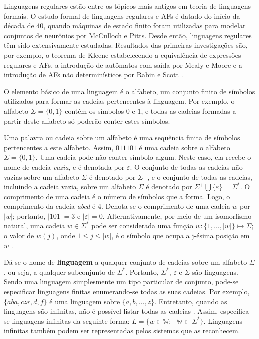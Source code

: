 \documentclass[12pt,a4paper]{article}
\begin{document}
Linguagens regulares estão entre os tópicos mais antigos em teoria de
linguagens formais. O estudo formal de linguagens regulares
e AFs é datado do início da década de 40, quando máquinas
de estado finito foram utilizadas para modelar conjuntos de neurônios
por McCulloch e Pitts. Desde então, linguagens regulares têm sido
extensivamente estudadas. Resultados das primeiras investigações são,
por exemplo, o teorema de Kleene estabelecendo a equivalência de
expressões regulares e AFs, a introdução de autômatos
com saída por Mealy e Moore e a introdução de AFs não
determinísticos por Rabin e Scott .

O elemento básico de uma linguagem é o alfabeto, um conjunto finito de símbolos
utilizados para formar as cadeias pertencentes à linguagem. Por exemplo, o
alfabeto $\Sigma = \{0,1\}$ contém os símbolos $0$ e $1$, e todas as cadeias
formadas a partir deste alfabeto só poderão conter estes símbolos.

Uma palavra ou cadeia sobre um alfabeto é uma sequência finita de símbolos
pertencentes a este alfabeto. Assim, $011101$ é uma cadeia sobre o alfabeto
$\Sigma = \{0, 1\}$. Uma cadeia pode não conter símbolo algum. Neste caso,
ela recebe o nome de cadeia \textit{vazia}, e é denotada por $\varepsilon$.
O conjunto de todas as cadeias não vazias sobre um alfabeto $\Sigma$ é
denotado por $\Sigma^+$, e o conjunto de todas as cadeias, incluindo
a cadeia vazia, sobre um alfabeto $\Sigma$ é denotado por
${\Sigma}^+ \bigcup \{\varepsilon\} = \Sigma^*$. O comprimento de uma cadeia
é o número de símbolos que a forma. Logo, o comprimento da cadeia
\emph{abcd} é 4. Denota-se o comprimento de uma cadeia $w$ por
$|w|$; portanto, $|101| = 3$ e $|\varepsilon| = 0$. Alternativamente,
por meio de um isomorfismo natural, uma cadeia $w \in \Sigma^*$ pode ser
considerada uma função $w: \{1,\ldots,|w|\} \mapsto \Sigma$; o
valor de $w(j)$, onde $1 \le j \le |w|$, é o símbolo que ocupa a j-ésima
posição em $w$ .

Dá-se o nome de \textbf{linguagem} a qualquer conjunto de cadeias sobre um
alfabeto $\Sigma$, ou seja, a qualquer subconjunto de $\Sigma^*$. Portanto,
$\Sigma^*$, $\varepsilon$ e $\Sigma$ são linguagens. Sendo uma linguagem
simplesmente um tipo particular de conjunto, pode-se especificar linguagens
finitas enumerando-se todas as suas cadeias. Por exemplo, $\{aba, czr, d, f\}$
é uma linguagem sobre $\{a, b, \ldots, z\}$. Entretanto, quando as
linguagens são infinitas, não é possível listar todas as cadeias
. Assim, especifica-se linguagens infinitas da seguinte forma:
$L = \{w \in \mathbb{W}: \mbox{ } \mathbb{W} \subset \Sigma^*\}$. Linguagens infinitas
também podem ser representadas pelos sistemas que as reconhecem.
\end{document}
